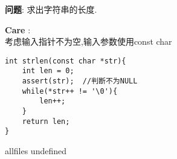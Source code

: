 \documentclass{article}
\begin{document}
\begin{CJK}{UTF8}{gbsn}     %

\else
    
\begin{description}
    \item{\textbf{问题}}: 求出字符串的长度.
    \item{\textbf{Care}} : 
    \\考虑输入指针不为空,输入参数使用const char
    \begin{lstlisting}
int strlen(const char *str){
	int len = 0;
	assert(str);  //判断不为NULL
	while(*str++ != '\0'){
		len++;
	}
	return len;
}
    \end{lstlisting}
\end{description}

\fi

\ifx allfiles undefined
\end{CJK}
\end{document}
